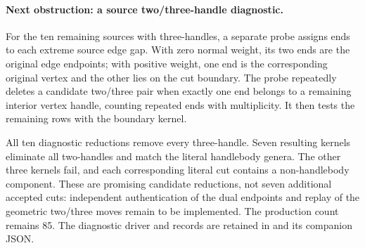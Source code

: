 \paragraph{Next obstruction: a source two/three-handle diagnostic.}
For the ten remaining sources with three-handles, a separate probe assigns
ends to each extreme source edge gap. With zero normal weight, its two ends
are the original edge endpoints; with positive weight, one end is the
corresponding original vertex and the other lies on the cut boundary.
The probe repeatedly deletes a candidate two/three pair when exactly one
end belongs to a remaining interior vertex handle, counting repeated ends
with multiplicity. It then tests the remaining rows with the boundary kernel.

All ten diagnostic reductions remove every three-handle. Seven resulting
kernels eliminate all two-handles and match the literal handlebody genera.
The other three kernels fail, and each corresponding literal cut contains a
non-handlebody component. These are promising candidate reductions, not seven
additional accepted cuts: independent authentication of the dual endpoints
and replay of the geometric two/three moves remain to be implemented. The
production count remains 85. The diagnostic driver and records are retained
in  and its companion JSON.
